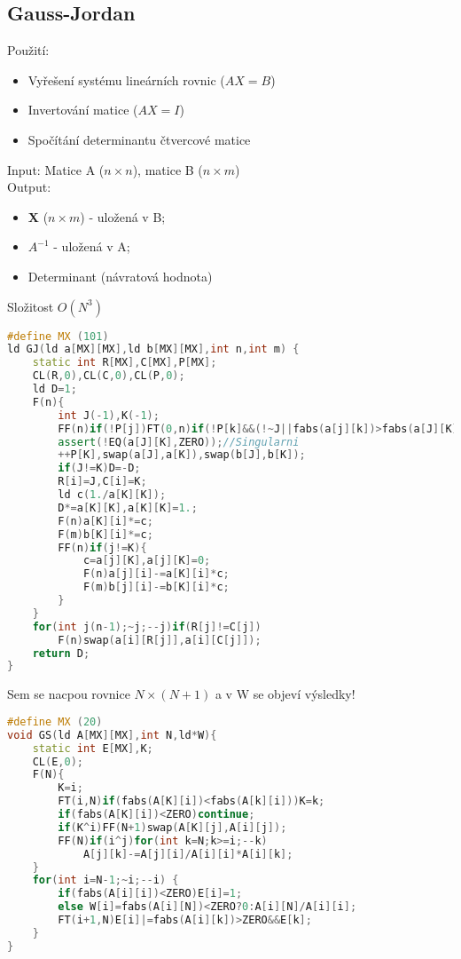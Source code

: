 \documentclass[11pt]{article}
\begin{document}
\subsection{Gauss-Jordan}
Použití:
\begin{itemize}
	\item Vyřešení systému lineárních rovnic ($AX=B$)
	\item Invertování matice ($AX=I$)
	\item Spočítání determinantu čtvercové matice
\end{itemize}
Input: Matice \textsf{A} ($n \times n$), matice \textsf{B} ($n \times m$)
\\Output:
\begin{itemize}
\item \textbf{X} ($n \times m$) - uložená v \textsf{B};
\item \textbf{$A^{-1}$} - uložená v \textsf{A};
\item Determinant (návratová hodnota)
\end{itemize}
Složitost $O(N^3)$
\begin{lstlisting}[language=C++]
#define MX (101)
ld GJ(ld a[MX][MX],ld b[MX][MX],int n,int m) {
    static int R[MX],C[MX],P[MX];
    CL(R,0),CL(C,0),CL(P,0);
    ld D=1;
    F(n){    
        int J(-1),K(-1);
        FF(n)if(!P[j])FT(0,n)if(!P[k]&&(!~J||fabs(a[j][k])>fabs(a[J][K])))J=j,K=k;
        assert(!EQ(a[J][K],ZERO));//Singularni
        ++P[K],swap(a[J],a[K]),swap(b[J],b[K]);
        if(J!=K)D=-D;
        R[i]=J,C[i]=K;
        ld c(1./a[K][K]);
        D*=a[K][K],a[K][K]=1.;
        F(n)a[K][i]*=c;
        F(m)b[K][i]*=c;
        FF(n)if(j!=K){
            c=a[j][K],a[j][K]=0;
            F(n)a[j][i]-=a[K][i]*c;
            F(m)b[j][i]-=b[K][i]*c;
        }
    }
    for(int j(n-1);~j;--j)if(R[j]!=C[j])
        F(n)swap(a[i][R[j]],a[i][C[j]]);
    return D;
}
\end{lstlisting}
Sem se nacpou rovnice $N\times (N+1)$ a v \textsf{W} se objeví výsledky!
\begin{lstlisting}[language=C++]
#define MX (20)
void GS(ld A[MX][MX],int N,ld*W){
    static int E[MX],K;
    CL(E,0);
    F(N){
        K=i;
        FT(i,N)if(fabs(A[K][i])<fabs(A[k][i]))K=k;
        if(fabs(A[K][i])<ZERO)continue;
        if(K^i)FF(N+1)swap(A[K][j],A[i][j]);
        FF(N)if(i^j)for(int k=N;k>=i;--k)
            A[j][k]-=A[j][i]/A[i][i]*A[i][k];
    }
    for(int i=N-1;~i;--i) {
        if(fabs(A[i][i])<ZERO)E[i]=1;
        else W[i]=fabs(A[i][N])<ZERO?0:A[i][N]/A[i][i];
        FT(i+1,N)E[i]|=fabs(A[i][k])>ZERO&&E[k];
    }
}
\end{lstlisting}
\end{document}

